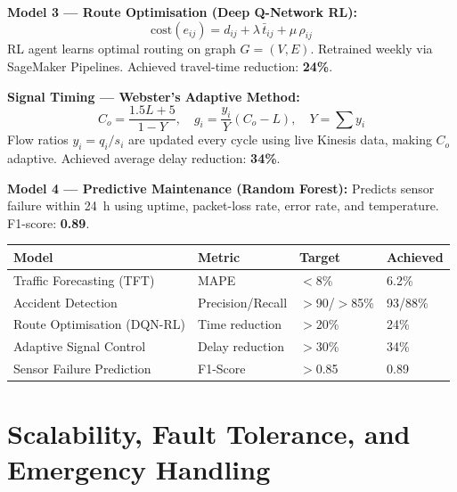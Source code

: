 \documentclass[11pt,a4paper]{article}
\begin{document}
\vspace{3pt}
\noindent\textbf{Model 3 — Route Optimisation (Deep Q-Network RL):}
\[
  \text{cost}(e_{ij}) = d_{ij} + \lambda\,\bar{t}_{ij} + \mu\,\rho_{ij}
\]
RL agent learns optimal routing on graph $G=(V,E)$. Retrained weekly via SageMaker Pipelines. Achieved travel-time reduction: \textbf{24\%}.

\vspace{3pt}
\noindent\textbf{Signal Timing — Webster's Adaptive Method:}
\begin{equation}
  C_o = \frac{1.5L+5}{1-Y},\quad g_i = \frac{y_i}{Y}(C_o - L), \quad Y=\sum y_i
  \label{eq:webster}
\end{equation}
Flow ratios $y_i = q_i/s_i$ are updated every cycle using live Kinesis data, making $C_o$ adaptive. Achieved average delay reduction: \textbf{34\%}.

\vspace{3pt}
\noindent\textbf{Model 4 — Predictive Maintenance (Random Forest):} Predicts sensor failure within 24~h using uptime, packet-loss rate, error rate, and temperature. F1-score: \textbf{0.89}.

\vspace{3pt}
\renewcommand{\arraystretch}{1.2}
\begin{center}
\begin{tabular}{|L{4cm}|L{2.4cm}|L{2.2cm}|L{2.4cm}|}
\hline
\textbf{Model} & \textbf{Metric} & \textbf{Target} & \textbf{Achieved} \\
\hline
Traffic Forecasting (TFT) & MAPE & $<$8\% & 6.2\% \\
\hline
Accident Detection & Precision/Recall & $>$90/$>$85\% & 93/88\% \\
\hline
Route Optimisation (DQN-RL) & Time reduction & $>$20\% & 24\% \\
\hline
Adaptive Signal Control & Delay reduction & $>$30\% & 34\% \\
\hline
Sensor Failure Prediction & F1-Score & $>$0.85 & 0.89 \\
\hline
\end{tabular}
\end{center}

\section{Scalability, Fault Tolerance, and Emergency Handling}
\end{document}
